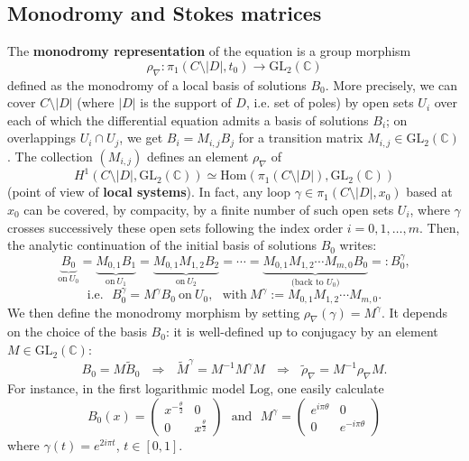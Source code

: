 \documentclass[12]{amsart}
\newcommand{\Log}{\boldsymbol{\mathrm{Log}}}
\begin{document}
\subsection{Monodromy and Stokes matrices}\label{sec:MonodStokes}
The {\bf monodromy representation} of the equation is a group morphism
$$\rho_\nabla:\pi_1(C\setminus\vert D\vert,t_0)\to\mathrm{GL}_2(\mathbb C)$$
defined as the monodromy of a local basis of solutions $B_0$.
More precisely, we can cover $C\setminus\vert D\vert$ (where $\vert D\vert$ is the support of $D$, i.e. set of poles)
by open sets $U_i$ over each of which the differential equation admits a basis of solutions $B_i$;
on overlappings $U_i\cap U_{j}$, we get $B_i=M_{i,j}B_{j}$ for a transition matrix $M_{i,j}\in\mathrm{GL}_2(\mathbb C)$.
The collection $(M_{i,j})$ defines an element $\rho_\nabla$ of 
$$H^1(C\setminus\vert D\vert,\mathrm{GL}_2(\mathbb C))\simeq\mathrm{Hom}(\pi_1(C\setminus\vert D\vert),\mathrm{GL}_2(\mathbb C))$$
(point of view of {\bf local systems}).
In fact, any loop $\gamma\in\pi_1(C\setminus\vert D\vert,x_0)$ based at $x_0$ can be covered, by compacity, 
by a finite number of such open sets $U_i$, where $\gamma$ crosses successively these open sets following 
the index order $i=0,1,\ldots,m$. Then, the analytic continuation of the initial basis of solutions $B_0$ writes:
$$\underbrace{B_0}_{\text{on}\ U_0}=\underbrace{M_{0,1}B_1}_{\text{on}\ U_1}=\underbrace{M_{0,1}M_{1,2}B_2}_{\text{on}\ U_2}=\cdots
=\underbrace{M_{0,1}M_{1,2}\cdots M_{m,0}B_0}_{\text{(back to $U_0$)}}=:B_0^\gamma,$$
$$\text{i.e.}\ \ \ B_0^\gamma=M^\gamma B_0\ \text{on}\  U_0,\ \ \ \text{with}\ M^\gamma:=M_{0,1}M_{1,2}\cdots M_{m,0}.$$
We then define the monodromy morphism by setting $\rho_\nabla(\gamma)= M^\gamma$. It depends on the choice 
of the basis $B_0$: it is well-defined up to conjugacy by an element $M\in\mathrm{GL}_2(\mathbb C)$:
$$B_0=M\tilde B_0\ \ \ \Rightarrow\ \ \ \tilde M^\gamma=M^{-1}M^\gamma M \ \ \ \Rightarrow\ \ \ \tilde\rho_\nabla=M^{-1}\rho_\nabla M.$$
For instance, in the first logarithmic model $\Log$, one easily calculate
$$B_0(x)=\begin{pmatrix}x^{-\frac{\theta}{2}}&0\\ 0&x^{\frac{\theta}{2}}\end{pmatrix}\ \ \ \text{and}\ \ \ M^\gamma=\begin{pmatrix}e^{i\pi\theta}&0\\ 0&e^{-i\pi\theta}\end{pmatrix}$$
where $\gamma(t)=e^{2i\pi t}$, $t\in[0,1]$.
\end{document}
